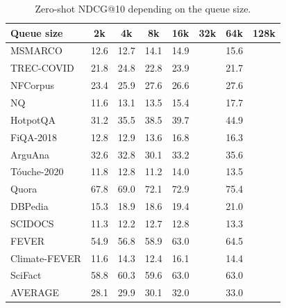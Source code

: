 \begin{table}[t!]
  \small
  \center
  \begin{tabular}{@{}l  c c c c c c c @{}}
    \toprule
    \textbf{Queue size} & 2k & 4k & 8k & 16k & 32k & 64k & 128k \\
    \midrule
    MSMARCO       & 12.6 & 12.7 & 14.1 & 14.9 & & 15.6 \\
    TREC-COVID    & 21.8 & 24.8 & 22.8 & 23.9 & & 21.7 \\
    NFCorpus      & 23.4 & 25.9 & 27.6 & 26.6 & & 27.6 \\
    NQ            & 11.6 & 13.1 & 13.5 & 15.4 & & 17.7 \\
    HotpotQA      & 31.2 & 35.5 & 38.5 & 39.7 & & 44.9 \\
    FiQA-2018     & 12.8 & 12.9 & 13.6 & 16.8 & & 16.3 \\
    ArguAna       & 32.6 & 32.8 & 30.1 & 33.2 & & 35.6 \\
    T\'ouche-2020 & 11.8 & 12.8 & 11.2 & 14.0 & & 13.5 \\
    Quora         & 67.8 & 69.0 & 72.1 & 72.9 & & 75.4 \\
    DBPedia       & 15.3 & 18.9 & 18.6 & 19.4 & & 21.0 \\
    SCIDOCS       & 11.3 & 12.2 & 12.7 & 12.8 & & 13.3 \\
    FEVER         & 54.9 & 56.8 & 58.9 & 63.0 & & 64.5 \\
    Climate-FEVER & 11.6 & 14.3 & 12.4 & 16.1 & & 14.4 \\
    SciFact       & 58.8 & 60.3 & 59.6 & 63.0 & & 63.0 \\
    \midrule
    AVERAGE       & 28.1 & 29.9 & 30.1 & 32.0 & & 33.0 \\
    \bottomrule
  \end{tabular}
  \caption{Zero-shot NDCG@10 depending on the queue size.}
  \label{tab:ndcg_zs_queue_size}
\end{table}

